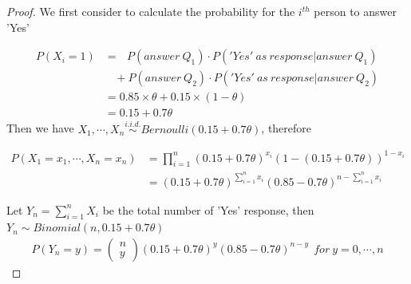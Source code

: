 \documentclass[a4paper, 11pt]{article}
\begin{document}
\begin{proof}
	
	We first consider to calculate the probability for the $i^{th}$ person to answer 'Yes'
	
\begin{align*}
P(X_i=1)&= \ \ \ P(answer \ Q_1)\cdot P\left(\left.'Yes' \ as\ response\right| answer \ Q_1 \right)\\ & \ \ \ \ + P(answer \ Q_2)\cdot P\left(\left.'Yes' \ as \ response\right| answer \ Q_2 \right)\\
& = 0.85\times\theta + 0.15\times(1-\theta)\\
& = 0.15+ 0.7\theta
\end{align*}
Then we have $X_1,\cdots,X_n\stackrel{i.i.d.}{\sim}Bernoulli \left( 0.15+ 0.7\theta\right)$, therefore

\begin{align*}
P\left(X_1=x_1,\cdots,X_n=x_n\right)& = \prod_{i=1}^n \left(0.15+0.7\theta\right)^{x_i}\left(1-\left(0.15+0.7\theta\right)\right)^{1-x_i}\\& = \left(0.15+0.7\theta\right)^{\sum_{i=1}^nx_i}\left(0.85-0.7\theta\right)^{n-\sum_{i=1}^nx_i}
\end{align*}

Let $Y_n =\sum_{i=1}^nX_i$ be the total number of 'Yes' response, then $Y_n\sim Binomial\left(n, 0.15+0.7\theta\right)$
\begin{align*}
P\left(Y_n=y\right)= \left(\begin{array}{c}
n\\
y
\end{array}\right)(0.15+0.7\theta)^y(0.85-0.7\theta)^{n-y}\ \ for \ y=0,\cdots,n
\end{align*}

\end{proof}
\end{document}
